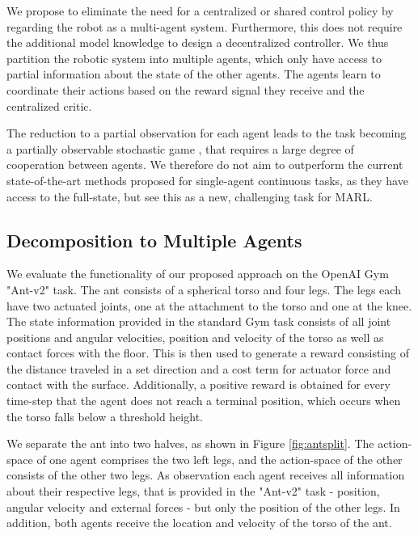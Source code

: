 \documentclass{article}
\begin{document}
We propose to eliminate the need for a centralized or shared control policy by regarding the robot as a multi-agent system.
Furthermore, this does not require the additional model knowledge to design a decentralized controller.
We thus partition the robotic system into multiple agents, which only have access to partial information about the state of the other agents. 
The agents learn to coordinate their actions based on the reward signal they receive and the centralized critic.

The reduction to a partial observation for each agent leads to the task becoming a partially observable stochastic game \cite{Hansen2004}, that requires a large degree of cooperation between agents.
We therefore do not aim to outperform the current state-of-the-art methods proposed for single-agent continuous tasks, as they have access to the full-state, but see this as a new, challenging task for \gls*{MARL}.

\vspace{-1.5mm}
\subsection{Decomposition to Multiple Agents}
\vspace{-1.5mm}
We evaluate the functionality of our proposed approach on the OpenAI Gym \cite{gym} "Ant-v2" task.
The ant consists of a spherical torso and four legs.
The legs each have two actuated joints, one at the attachment to the torso and one at the knee.
The state information provided in the standard Gym task consists of all joint positions and angular velocities, position and velocity of the torso as well as contact forces with the floor.
This is then used to generate a reward consisting of the distance traveled in a set direction and a cost term for actuator force and contact with the surface.
Additionally, a positive reward is obtained for every time-step that the agent does not reach a terminal position, which occurs when the torso falls below a threshold height.

We separate the ant into two halves, as shown in Figure \ref{fig:antsplit}.
The action-space of one agent comprises the two left legs, and the action-space of the other consists of the other two legs.
As observation each agent receives all information about their respective legs, that is provided in the "Ant-v2" task - position, angular velocity and external forces - but only the position of the other legs.
In addition, both agents receive the location and velocity of the torso of the ant.
\end{document}
